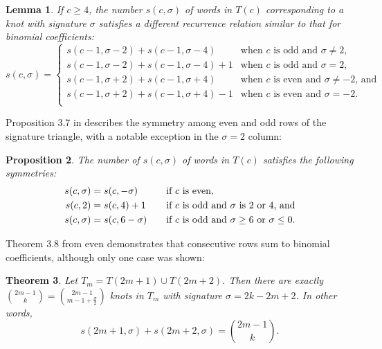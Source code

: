 \documentclass[11pt]{amsart}
\newtheorem{theorem}{Theorem}[section]
\newtheorem{lemma}[theorem]{Lemma}
\newtheorem{proposition}[theorem]{Proposition}
\theoremstyle{definition}
\theoremstyle{remark}
\numberwithin{equation}{section}
\begin{document}
\begin{lemma}
\cite[Lemma 3.6]{CLMR}
\label{lem:signaturerecursion2}
If $c\geq 4$, the number $s(c, \sigma)$ of words in $T(c)$ corresponding to a knot with signature $\sigma$ satisfies a different recurrence relation similar to that for binomial coefficients:
\begin{equation}
\label{eq:recursion2}
s(c,\sigma)=
\begin{cases}
s(c-1,\sigma-2)+s(c-1,\sigma-4) & \text{when $c$ is odd and $\sigma\neq 2$,}\\
s(c-1,\sigma-2)+s(c-1,\sigma-4)+1 & \text{when $c$ is odd and $\sigma= 2$,}\\
s(c-1,\sigma+2)+s(c-1,\sigma+4) & \text{when $c$ is even and $\sigma\neq -2$, and}\\
s(c-1,\sigma+2)+s(c-1,\sigma+4)-1 & \text{when $c$ is even and $\sigma= -2$.}\\
\end{cases}
\end{equation}
\end{lemma}

Proposition 3.7 in \cite{CLMR} describes the symmetry among even and odd rows of the signature triangle, with a notable exception in the $\sigma=2$ column:

\begin{proposition}
\cite[Proposition 3.7]{CLMR}
\label{prop:sym}
    The number of $s(c,\sigma)$ of words in $T(c)$ satisfies the following symmetries:
    \begin{alignat*}{3}
        s(c,\sigma) = & \; s(c,-\sigma) & \quad &\text{if $c$ is even,}\\
    s(c,2) = & \; s(c,4)+1 & \quad & \text{if $c$ is odd and $\sigma$ is 2 or 4, and}\\
        s(c,\sigma)  = & \;   s(c,6-\sigma)& \quad & \text{if $c$ is odd and $\sigma\geq 6$~\text{or}~$\sigma\leq0$.}    
    \end{alignat*}
\end{proposition}


Theorem 3.8 from \cite{CLMR} even demonstrates that consecutive rows sum to binomial coefficients, although only one case was shown:


\begin{theorem}
\cite[Theorem 3.8]{CLMR}
\label{thm:binomials}
Let $T_m=T(2m+1)\cup T(2m+2)$.  %
Then there are exactly 
$\binom{2m-1}{k}=\binom{2m-1}{m-1+\frac{\sigma}{2}}$  knots in $T_m$
with signature $\sigma=2k-2m+2$. In other words, 
\[s(2m+1,\sigma) + s(2m+2,\sigma) = \binom{2m-1}{k}.\]
\end{theorem}
\end{document}
